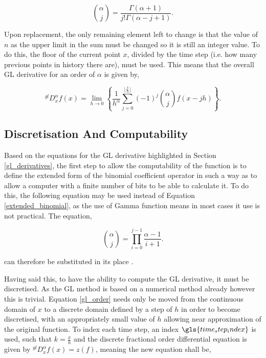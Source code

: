 \begin{equation}\label{extended_binomial}
	{\alpha \choose j} = \frac{\Gamma(\alpha + 1)}{j!\Gamma(\alpha-j+1)}.
\end{equation}

Upon replacement, the only remaining element left to change is that the value of $n$ as the upper limit in the sum must be changed so it is still an integer value. To do this, the floor of the current point $x$, divided by the time step (i.e. how many previous points in history there are), must be used. This means that the overall GL derivative for an order of $\alpha$ is given by,

\begin{equation}\label{gl_order}
	^{gl}D^{\alpha}_{x}f(x) = \lim_{h \to 0} \left\{\frac{1}{h^{\alpha}}\sum_{j=0}^{\lfloor\frac{x}{h}\rfloor} (-1)^{j} {\alpha \choose j} f(x-jh)\right\}.
\end{equation}

\subsection{Discretisation And Computability}

Based on the equations for the GL derivative highlighted in Section \ref{gl_derivatives}, the first step to allow the computability of the function is to define the extended form of the binomial coefficient operator in such a way as to allow a computer with a finite number of bits to be able to calculate it. To do this, the following equation may be used instead of Equation \ref{extended_binomial}, as the use of Gamma function means in most cases it use is not practical. The equation,

\begin{equation}\label{computable_extended_binomial}
	{\alpha \choose j} = \prod_{i=0}^{j-1}\frac{\alpha-1}{i+1}.
\end{equation}

can therefore be substituted in its place \cite{Fractional_calculus_in_pharmacokinetics}. 

Having said this, to have the ability to compute the GL derivative, it must be discretised. As the GL method is based on a numerical method already however this is trivial. Equation \ref{gl_order} needs only be moved from the continuous domain of $x$ to a discrete domain defined by a step of $h$ in order to become discretised, with an appropriately small value of $h$ allowing near approximation of the original function. To index each time step, an index $\gls{time_step_index}$ is used, such that $k=\frac{x}{h}$ and the discrete fractional order differential equation is given by $^{gl}D^{\alpha}_{x}f(x) = z(f)$, meaning the new equation shall be, 

